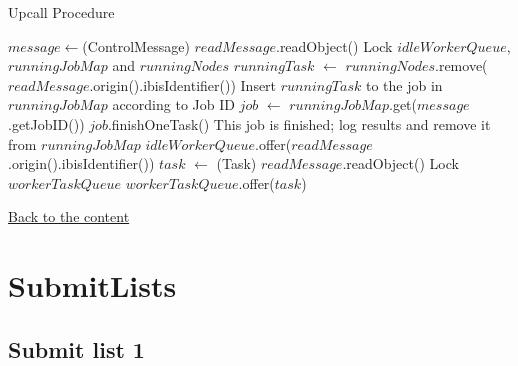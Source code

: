 \begin{algorithm}
    \caption{Upcall Procedure}\label{algo:upcall}
    \begin{algorithmic}[1]
            \State $message\gets$(ControlMessage) $readMessage$.readObject()
            \State Lock $idleWorkerQueue$,$runningJobMap$ and $runningNodes$
            \State $runningTask$ $\gets$ $runningNodes$.remove($readMessage$.origin().ibisIdentifier())
             
                    \State Insert $runningTask$ to the job in $runningJobMap$ according to Job ID 
                \EndIf
            \Else
                \State $job$ $\gets$ $runningJobMap$.get($message$.getJobID())
                \State $job$.finishOneTask()
                    \State This job is finished; log results and remove it from $runningJobMap$
                \EndIf
            \EndIf
            \State $idleWorkerQueue$.offer($readMessage$.origin().ibisIdentifier())
        \Else {}
            \State $task$ $\gets$ (Task) $readMessage$.readObject()
            \State Lock $workerTaskQueue$
            \State $workerTaskQueue$.offer($task$)
        \EndIf
        \EndProcedure
    \end{algorithmic}
    \hyperlink{Algo4}{Back to the content}
\end{algorithm}

\section{SubmitLists}
\subsection{Submit list 1}

